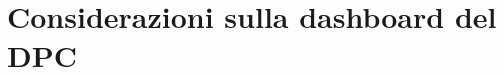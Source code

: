 \documentclass[../../main.tex]{subfiles}
\begin{document}
\section{Considerazioni sulla dashboard del DPC}\label{s:considerazioni}
\end{document}
